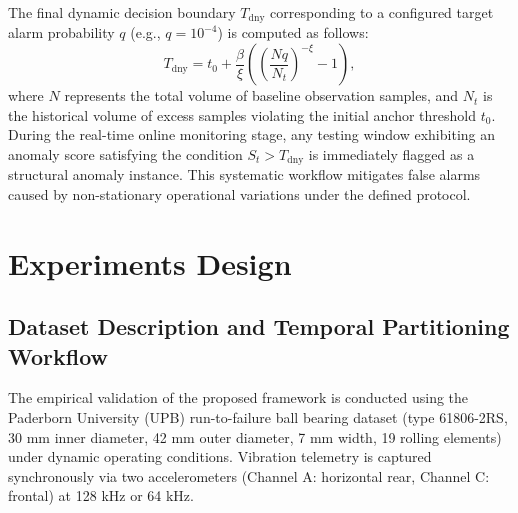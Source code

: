 \documentclass[cmes,article,submit,moreauthors,pdftex]{Definitions/tsp}
\begin{document}
The final dynamic decision boundary $T_{\mathrm{dny}}$ corresponding to a configured target alarm probability $q$ (e.g., $q = 10^{-4}$) is computed as follows:
\begin{equation}
T_{\mathrm{dny}} = t_{0} + \frac{\beta}{\xi} \left(\left(\frac{N q}{N_{t}}\right)^{-\xi} - 1\right),
\tag{24}
\end{equation}
where $N$ represents the total volume of baseline observation samples, and $N_{t}$ is the historical volume of excess samples violating the initial anchor threshold $t_{0}$. During the real-time online monitoring stage, any testing window exhibiting an anomaly score satisfying the condition $S_{t} > T_{\mathrm{dny}}$ is immediately flagged as a structural anomaly instance. This systematic workflow mitigates false alarms caused by non-stationary operational variations under the defined protocol.


\section{Experiments Design} \label{sect:s4}

\subsection{Dataset Description and Temporal Partitioning Workflow} \label{sect:s4dot1}
The empirical validation of the proposed framework is conducted using the Paderborn University (UPB) run-to-failure ball bearing dataset (type 61806-2RS, 30 mm inner diameter, 42 mm outer diameter, 7 mm width, 19 rolling elements) under dynamic operating conditions. Vibration telemetry is captured synchronously via two accelerometers (Channel A: horizontal rear, Channel C: frontal) at 128 kHz or 64 kHz.
\end{document}
